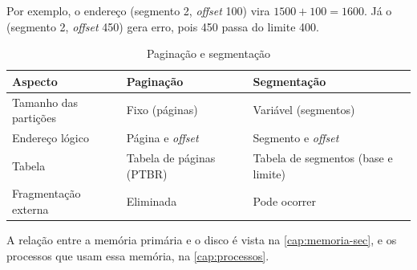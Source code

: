 Por exemplo, o endereço (segmento 2, \textit{offset} 100) vira $1500 + 100 = 1600$. Já o (segmento 2, \textit{offset} 450) gera erro, pois 450 passa do limite 400.

\begin{table}[H]
  \centering
  \caption{Paginação e segmentação}\label{tab:pag-seg}
  \begin{tabularx}{\linewidth}{lXX}
    \toprule
    \textbf{Aspecto} & \textbf{Paginação} & \textbf{Segmentação} \\
    \midrule
    Tamanho das partições & Fixo (páginas) & Variável (segmentos) \\
    Endereço lógico & Página e \textit{offset} & Segmento e \textit{offset} \\
    Tabela & Tabela de páginas (PTBR) & Tabela de segmentos (base e limite) \\
    Fragmentação externa & Eliminada & Pode ocorrer \\
    \bottomrule
  \end{tabularx}
\end{table}

A relação entre a memória primária e o disco é vista na \autoref{cap:memoria-sec}, e os processos que usam essa memória, na \autoref{cap:processos}.